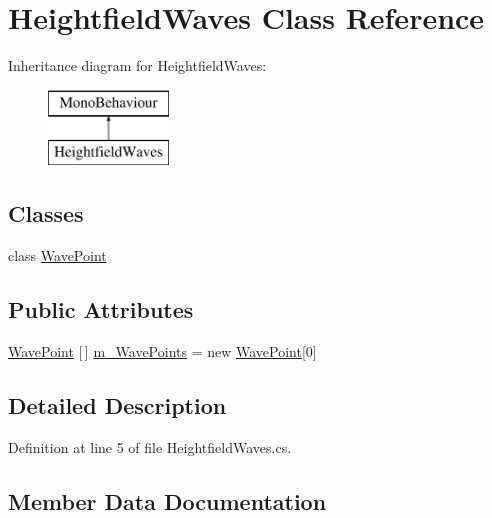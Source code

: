 \hypertarget{class_heightfield_waves}{}\section{Heightfield\+Waves Class Reference}
\label{class_heightfield_waves}
Inheritance diagram for Heightfield\+Waves\+:\begin{figure}[H]
\begin{center}
\leavevmode
\includegraphics[height=2.000000cm]{class_heightfield_waves}
\end{center}
\end{figure}
\subsection*{Classes}
\begin{DoxyCompactItemize}
\item 
class \mbox{\hyperlink{class_heightfield_waves_1_1_wave_point}{Wave\+Point}}
\end{DoxyCompactItemize}
\subsection*{Public Attributes}
\begin{DoxyCompactItemize}
\item 
\mbox{\hyperlink{class_heightfield_waves_1_1_wave_point}{Wave\+Point}} \mbox{[}$\,$\mbox{]} \mbox{\hyperlink{class_heightfield_waves_a8de2899fa43a4cc662bb801630b26a10}{m\+\_\+\+Wave\+Points}} = new \mbox{\hyperlink{class_heightfield_waves_1_1_wave_point}{Wave\+Point}}\mbox{[}0\mbox{]}
\end{DoxyCompactItemize}


\subsection{Detailed Description}


Definition at line 5 of file Heightfield\+Waves.\+cs.



\subsection{Member Data Documentation}
\mbox{\label{class_heightfield_waves_a8de2899fa43a4cc662bb801630b26a10}} 
